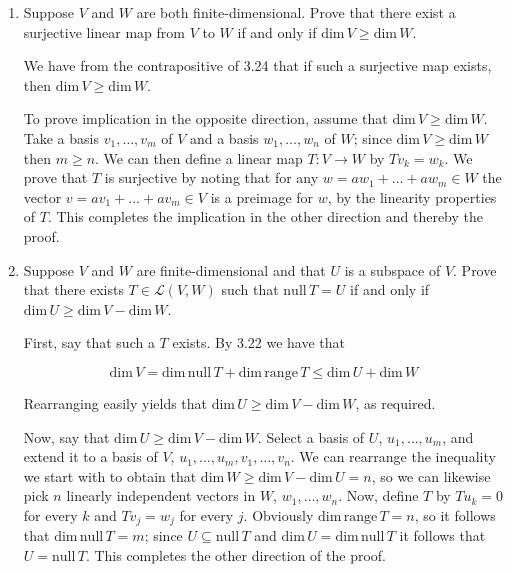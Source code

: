 \documentclass{book}
\begin{document}
\begin{enumerate}
\item Suppose \(V\) and \(W\) are both finite-dimensional.  Prove that there exist a surjective linear map from \(V\) to \(W\) if and only if \(\textrm{dim} \, V \geq \textrm{dim} \, W\).

We have from the contrapositive of 3.24 that if such a surjective map exists, then \(\textrm{dim} \, V \geq \textrm{dim} \, W\).

To prove implication in the opposite direction, assume that \(\textrm{dim} \, V \geq \textrm{dim} \, W\).  Take a basis \(v_1,\dots,v_m\) of \(V\) and a basis \(w_1,\dots,w_n\) of \(W\); since \(\textrm{dim} \, V \geq \textrm{dim} \, W\) then \(m \geq n\).  We can then define a linear map \(T: V \rightarrow W\) by \(Tv_k=w_k\).  We prove that \(T\) is surjective by noting that for any \(w=aw_1+\dots+aw_m \in W\) the vector \(v=av_1+\dots+av_m \in V\) is a preimage for \(w\), by the linearity properties of \(T\).  This completes the implication in the other direction and thereby the proof.

\item Suppose \(V\) and \(W\) are finite-dimensional and that \(U\) is a subspace of \(V\).  Prove that there exists \(T \in \mathcal{L}(V,W)\) such that \(\textrm{null} \, T=U\) if and only if \(\textrm{dim} \, U \geq \textrm{dim} \, V - \textrm{dim} \, W\).

First, say that such a \(T\) exists.  By 3.22 we have that

\begin{equation*}
    \text{dim} \, V = \text{dim} \, \text{null} \, T + \text{dim} \, \text{range} \, T \leq \text{dim} \, U + \text{dim} \, W
\end{equation*}

Rearranging easily yields that \(\textrm{dim} \, U \geq \textrm{dim} \, V - \textrm{dim} \, W\), as required.

Now, say that \(\textrm{dim} \, U \geq \textrm{dim} \, V - \textrm{dim} \, W\).  Select a basis of \(U\), \(u_1,\dots,u_m\), and extend it to a basis of \(V\), \(u_1,\dots,u_m,v_1,\dots,v_n\).  We can rearrange the inequality we start with to obtain that \(\textrm{dim} \, W \geq \textrm{dim} \, V - \textrm{dim} \, U = n\), so we can likewise pick \(n\) linearly independent vectors in \(W\), \(w_1,\dots,w_n\).  Now, define \(T\) by \(Tu_k=0\) for every \(k\) and \(Tv_j=w_j\) for every \(j\).  Obviously \(\textrm{dim} \, \textrm{range} \, T = n\), so it follows that \(\textrm{dim} \, \textrm{null} \, T = m\); since \(U \subseteq \textrm{null} \, T\) and \(\text{dim} \, U = \text{dim} \, \textrm{null} \, T\) it follows that \(U = \textrm{null} \, T\).  This completes the other direction of the proof.


\end{enumerate}
\end{document}
